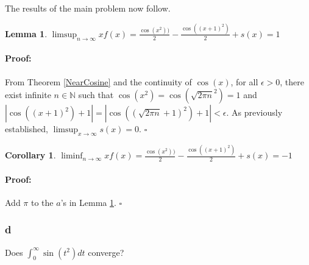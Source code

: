\documentclass{article}
\newenvironment{proof}{\paragraph{Proof:}}{\hfill$\square$}
\newtheorem{lemma}[theorem]{Lemma}
\newtheorem{corollary}[theorem]{Corollary}
\begin{document}
The results of the main problem now follow.

\begin{lemma}
\label{limsupResult}
$\limsup_{n\rightarrow\infty} xf(x) = \frac{\cos(x^2))}{2} - \frac{\cos((x+1)^2)}{2} + s(x) = 1$
\end{lemma}

\begin{proof}
From Theorem \ref{NearCosine} and the continuity of $\cos(x)$, for all $\epsilon > 0$, there exist infinite $n \in \mathbb{N}$ such that $\cos(x^2) = \cos(\sqrt{2\pi n}^2) = 1$ and $|\cos\left((x+1)^2\right) + 1| = |\cos\left((\sqrt{2\pi n}+1)^2\right) + 1| < \epsilon$. As previously established, $\limsup_{x\rightarrow\infty} s(x) = 0$. 
\end{proof}

\begin{corollary}
$\liminf_{n\rightarrow\infty} xf(x) = \frac{\cos(x^2))}{2} - \frac{\cos((x+1)^2)}{2} + s(x) = -1$
\end{corollary}

\begin{proof}
Add $\pi$ to the $a$'s in Lemma \ref{limsupResult}.
\end{proof}

\subsubsection*{d}

Does $\int_0^\infty \sin(t^2)dt$ converge?
\end{document}
